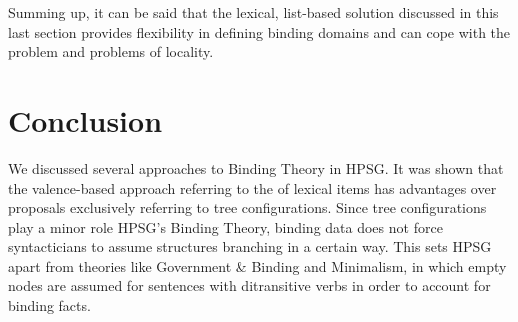 \documentclass[output=paper
	        ,collection
	        ,collectionchapter
 	        ,biblatex
                ,babelshorthands
                ,newtxmath
                ,draftmode
                ,colorlinks, citecolor=brown
]{langscibook}
\begin{document}



Summing up, it can be said that the lexical, list-based solution discussed in this last section
provides flexibility in defining binding domains and can cope with the \iwithini problem and
problems of locality. 




\section{Conclusion}

We discussed several approaches to Binding Theory in HPSG. It was shown that the
valence-based approach referring to the \argstl of lexical items has advantages over proposals
exclusively referring to tree configurations. Since tree configurations play a minor role HPSG's
Binding Theory, binding data does not force syntacticians to assume structures branching in a
certain way. This sets HPSG apart from theories like Government \& Binding and Minimalism, in which
empty nodes are assumed for sentences with ditransitive verbs in order to account for binding facts.
\end{document}
